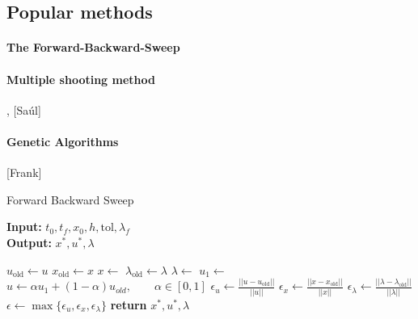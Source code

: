 \subsection{Popular methods}
\paragraph{The Forward-Backward-Sweep}
	\cite{hackbusch1978numerical}
\paragraph{Multiple shooting method}
	\cite*{Pesch1989} , [Saúl]
\paragraph{Genetic Algorithms}
	[Frank]
\begin{algorithm}
	\caption{Forward Backward Sweep } \label{alg:forward_backward_sweep}
    \begin{flushleft}
    	\hspace*{\algorithmicindent} \textbf{Input:} 
    	$t_0, t_f, x_0,h, \text{tol}, \lambda_{f}$ \\
    	\hspace*{\algorithmicindent} \textbf{Output:} 
   		$x^*, u^*, \lambda$
   	\end{flushleft}
	\begin{algorithmic}
				\State $u_{\text{old}} \gets u$ 
                \State $x_{\text{old}} \gets x$ 
                \State $ x \gets$
                \State $\lambda_{\text{old}} \gets \lambda $
				\State $\lambda \gets$ 
                \State $u_1 \gets$ 
                \State 
                	$u \gets \alpha u_1 + (1-\alpha)u_{old}, 
                	\qquad \alpha \in [0, 1]$
                \State 
                	$\epsilon_u \gets \displaystyle 
                	\frac{||u - u_{\text{old}}||}{||u||}$
                \State 
                	$\epsilon_x \gets \displaystyle 
                	\frac{||x - x_{\text{old}}||}{||x||}$
                \State 
                	$\epsilon_{\lambda} \gets \displaystyle 
                	\frac{||\lambda - \lambda_{\text{old}}||}{||\lambda||}$
                \State 
                	$\epsilon \gets 
                		\max{ 
                			\{ \epsilon_u, \epsilon_x, \epsilon_{\lambda} \}
                		}$
			\EndWhile\label{}
			\State \textbf{return} $ x^*, u^*, \lambda$
		\EndProcedure
	\end{algorithmic}
\end{algorithm}
